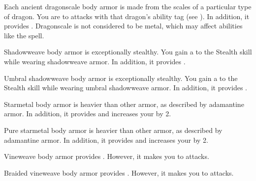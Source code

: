        Each ancient dragonscale body armor is made from the scales of a particular type of dragon.
      You are  to attacks with that dragon's ability tag (see ).
      In addition, it provides  .
      Dragonscale is not considered to be metal, which may affect abilities like the  spell.

       Shadowweave body armor is exceptionally stealthy.
      You gain a   to the Stealth skill while wearing shadowweave armor.
      In addition, it provides  .

       Umbral shadowweave body armor is exceptionally stealthy.
      You gain a   to the Stealth skill while wearing umbral shadowweave armor.
      In addition, it provides  .

       Starmetal body armor is heavier than other armor, as described by adamantine armor.
      In addition, it provides   and increases your  by 2.

       Pure starmetal body armor is heavier than other armor, as described by adamantine armor.
      In addition, it provides   and increases your  by 2.

       Vineweave body armor provides  .
      However, it makes you \vulnerable to \atFire attacks.

       Braided vineweave body armor provides  .
      However, it makes you \vulnerable to \atFire attacks.

